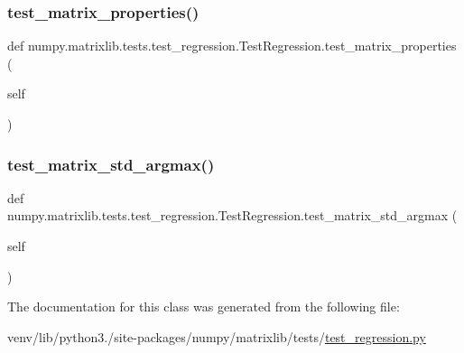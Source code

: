 \subsubsection{\texorpdfstring{test\+\_\+matrix\+\_\+properties()}{test\_matrix\_properties()}}
{\footnotesize\ttfamily def numpy.\+matrixlib.\+tests.\+test\+\_\+regression.\+Test\+Regression.\+test\+\_\+matrix\+\_\+properties (\begin{DoxyParamCaption}\item[{}]{self }\end{DoxyParamCaption})}

\mbox{\label{classnumpy_1_1matrixlib_1_1tests_1_1test__regression_1_1TestRegression_abb8ff7079c7c6da8174fa6a820eb12ea}} 
\subsubsection{\texorpdfstring{test\+\_\+matrix\+\_\+std\+\_\+argmax()}{test\_matrix\_std\_argmax()}}
{\footnotesize\ttfamily def numpy.\+matrixlib.\+tests.\+test\+\_\+regression.\+Test\+Regression.\+test\+\_\+matrix\+\_\+std\+\_\+argmax (\begin{DoxyParamCaption}\item[{}]{self }\end{DoxyParamCaption})}



The documentation for this class was generated from the following file\+:\begin{DoxyCompactItemize}
\item 
venv/lib/python3./site-\/packages/numpy/matrixlib/tests/\hyperlink{matrixlib_2tests_2test__regression_8py}{test\+\_\+regression.\+py}\end{DoxyCompactItemize}
